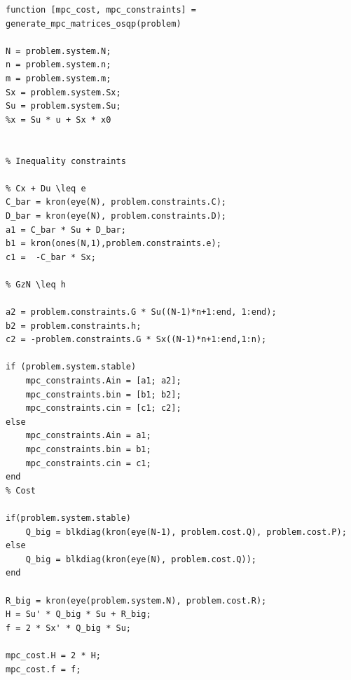 \begin{lstlisting}[caption={generate\_mpc\_matrices\_osqp.m}, label={lst:gen_mpc_osqp}]
function [mpc_cost, mpc_constraints] = generate_mpc_matrices_osqp(problem)

N = problem.system.N;
n = problem.system.n;
m = problem.system.m;
Sx = problem.system.Sx;
Su = problem.system.Su;
%x = Su * u + Sx * x0


% Inequality constraints

% Cx + Du \leq e
C_bar = kron(eye(N), problem.constraints.C);
D_bar = kron(eye(N), problem.constraints.D);
a1 = C_bar * Su + D_bar;
b1 = kron(ones(N,1),problem.constraints.e);
c1 =  -C_bar * Sx;

% GzN \leq h

a2 = problem.constraints.G * Su((N-1)*n+1:end, 1:end);
b2 = problem.constraints.h;
c2 = -problem.constraints.G * Sx((N-1)*n+1:end,1:n);

if (problem.system.stable)
    mpc_constraints.Ain = [a1; a2];
    mpc_constraints.bin = [b1; b2];
    mpc_constraints.cin = [c1; c2];
else
    mpc_constraints.Ain = a1;
    mpc_constraints.bin = b1;
    mpc_constraints.cin = c1;
end
% Cost

if(problem.system.stable)
    Q_big = blkdiag(kron(eye(N-1), problem.cost.Q), problem.cost.P);
else
    Q_big = blkdiag(kron(eye(N), problem.cost.Q));
end    

R_big = kron(eye(problem.system.N), problem.cost.R);
H = Su' * Q_big * Su + R_big;
f = 2 * Sx' * Q_big * Su;

mpc_cost.H = 2 * H;
mpc_cost.f = f;
\end{lstlisting}

